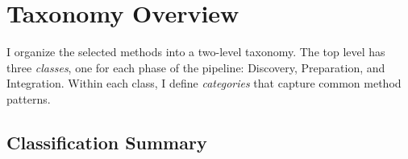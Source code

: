 \documentclass[sigconf]{acmart}
\begin{document}
\section{Taxonomy Overview}

I organize the selected methods into a two-level taxonomy. The top level has three \emph{classes}, one for each phase of the pipeline: Discovery, Preparation, and Integration. Within each class, I define \emph{categories} that capture common method patterns.


\subsection{Classification Summary}

\end{document}
